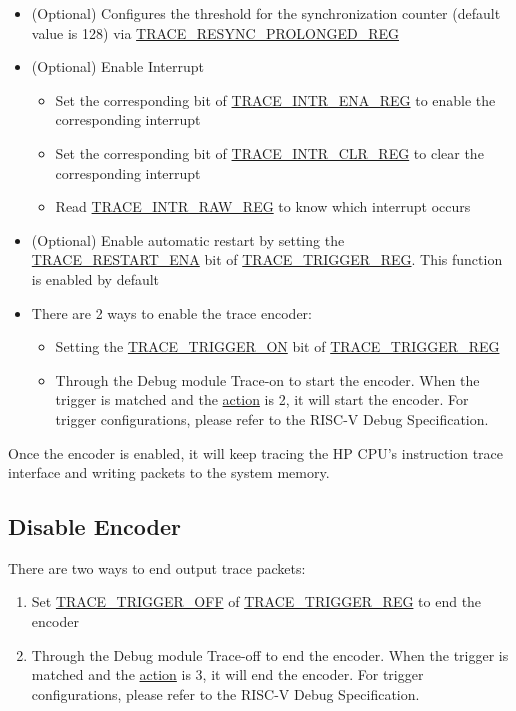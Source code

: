 \documentclass[main\_\_EN.tex]{subfiles}
\begin{document}
\begin{itemize}
    \item (Optional) Configures the threshold for the synchronization counter (default value is 128) via \hyperref[regdesc:TRACERESYNCPROLONGEDREG]{TRACE\_RESYNC\_PROLONGED\_REG}


    \item (Optional) Enable Interrupt
        \begin{itemize}
            \item Set the corresponding bit of \hyperref[regdesc:TRACEINTRENAREG]{TRACE\_INTR\_ENA\_REG} to enable the corresponding interrupt
            \item Set the corresponding bit of \hyperref[regdesc:TRACEINTRCLRREG]{TRACE\_INTR\_CLR\_REG} to clear the corresponding interrupt
            \item Read \hyperref[regdesc:TRACEINTRRAWREG]{TRACE\_INTR\_RAW\_REG} to know which interrupt occurs
        \end{itemize}
    \item (Optional) Enable automatic restart by setting the \hyperref[fielddesc:TRACERESTARTENA]{TRACE\_RESTART\_ENA} bit of \hyperref[regdesc:TRACETRIGGERREG]{TRACE\_TRIGGER\_REG}. This function is enabled by default

    \item There are 2 ways to enable the trace encoder:
        \begin{itemize}
            \item Setting the \hyperref[fielddesc:TRACETRIGGERON]{TRACE\_TRIGGER\_ON} bit of \hyperref[regdesc:TRACETRIGGERREG]{TRACE\_TRIGGER\_REG}
            \item Through the Debug module Trace-on to start the encoder. When the trigger is matched and the \hyperref[fielddesc:MCONTROLACTION]{action} is 2, it will start the encoder. For trigger configurations, please refer to the RISC-V Debug Specification.
        \end{itemize}

\end{itemize}

Once the encoder is enabled, it will keep tracing the HP CPU's instruction trace interface and writing packets to the system memory.

\subsection{Disable Encoder}

There are two ways to end output trace packets:
\begin{enumerate}
    \item Set \hyperref[fielddesc:TRACETRIGGEROFF]{TRACE\_TRIGGER\_OFF} of \hyperref[regdesc:TRACETRIGGERREG]{TRACE\_TRIGGER\_REG} to end the encoder
    \item Through the Debug module Trace-off to end the encoder. When the trigger is matched and the \hyperref[fielddesc:MCONTROLACTION]{action} is 3, it will end the encoder. For trigger configurations, please refer to the RISC-V Debug Specification.
\end{enumerate}
\end{document}
